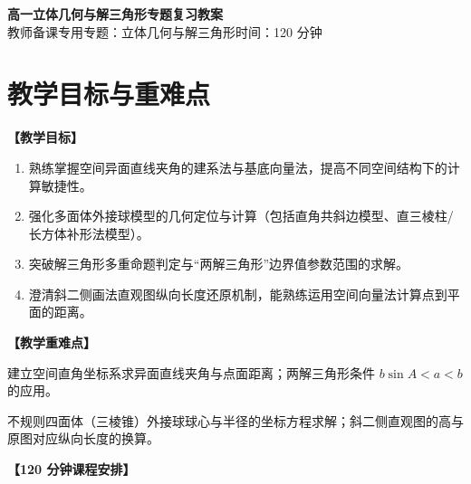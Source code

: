 \documentclass[11pt,a4paper]{ctexart}
\begin{document}
\begin{center}
  {\Large\bfseries 高一立体几何与解三角形专题复习教案}\\
  \vspace{0.6em}
  {\large 教师备课专用\quad 专题：立体几何与解三角形\quad 时间：120 分钟}
\end{center}

\section{教学目标与重难点}
\textbf{【教学目标】}
\begin{enumerate}[label=\arabic*. , leftmargin=2em, itemsep=0.1em, topsep=0.2em]
  \item 熟练掌握空间异面直线夹角的建系法与基底向量法，提高不同空间结构下的计算敏捷性。
  \item 强化多面体外接球模型的几何定位与计算（包括直角共斜边模型、直三棱柱/长方体补形法模型）。
  \item 突破解三角形多重命题判定与“两解三角形”边界值参数范围的求解。
  \item 澄清斜二侧画法直观图纵向长度还原机制，能熟练运用空间向量法计算点到平面的距离。
\end{enumerate}

\vspace{0.8em}
\textbf{【教学重难点】}
\begin{description}[leftmargin=2em, itemsep=0.1em, topsep=0.2em]
  \item[重点] 建立空间直角坐标系求异面直线夹角与点面距离；两解三角形条件 $b\sin A < a < b$ 的应用。
  \item[难点] 不规则四面体（三棱锥）外接球球心与半径的坐标方程求解；斜二侧直观图的高与原图对应纵向长度的换算。
\end{description}

\vspace{0.6em}
\textbf{【120 分钟课程安排】}
\end{document}

